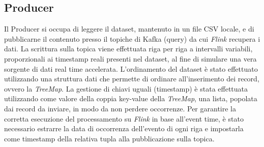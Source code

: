 \documentclass[conference]{IEEEtran}
\begin{document}
\subsection*{\textbf{Producer}}
Il Producer si occupa di leggere il ​dataset, mantenuto in un
file CSV locale, e di pubblicarne il contenuto presso il
topiche di Kafka (query) da cui \emph{Flink} recupera i dati. La scrittura sulla
topica viene effettuata riga per riga a intervalli variabili, proporzionali ai timestamp reali presenti nel dataset, al fine di simulare una
vera sorgente di dati ​real time ​accelerata. L'ordinamento del dataset \`{e} stato effettuato utilizzando una struttura dati che permette di ordinare all'inserimento dei record, ovvero la \emph{TreeMap}. La gestione di chiavi uguali (timestamp) \`{e} stata effettuata utilizzando come valore della coppia key-value della \emph{TreeMap}, una lista, popolata dai record da inviare, in modo da non perdere occorrenze.
Per garantire la corretta esecuzione del processamento su
\emph{Flink} in base all'​ event time,​ \`{e} stato necessario
estrarre la data di occorrenza dell'evento di ogni riga e
impostarla come ​timestamp della relativa tupla alla
pubblicazione sulla topica. 
\end{document}
